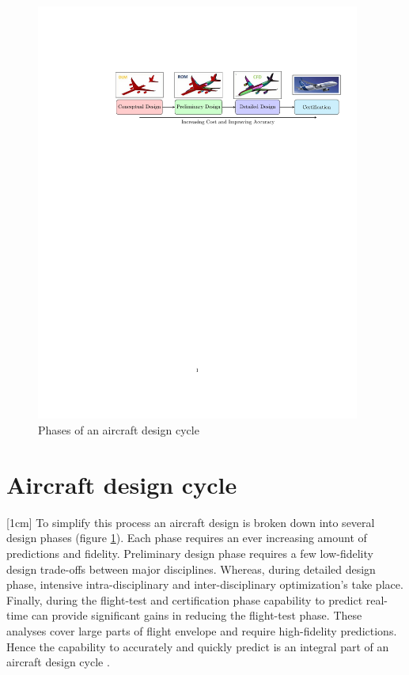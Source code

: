 \begin{figure}[!ht]
\label{figPhasesOfAircraftDesign}
  \centering
  
    \includegraphics[clip, trim=4.5cm 19cm 0.5cm 4cm,width=0.95\textwidth]
    {flowchart/aircraftDesignCycleFlowChart}
  
  \caption{Phases of an aircraft design cycle}
\end{figure}

\section{Aircraft design cycle}\label{secSircraftDesignCycle}
[1cm]
To simplify this process an aircraft design is broken down into several design phases (figure \ref{figPhasesOfAircraftDesign}). Each phase requires an ever increasing amount of predictions and fidelity. Preliminary design phase requires a few low-fidelity design trade-offs between major disciplines. Whereas, during detailed design phase, intensive intra-disciplinary and inter-disciplinary optimization's take place. Finally, during the flight-test and certification phase capability to predict real-time can provide significant gains in reducing the flight-test phase. These analyses cover large parts of flight envelope and require high-fidelity predictions. Hence the capability to accurately and quickly predict is an integral part of an aircraft design cycle \cite{raymer2012aircraft}. 

